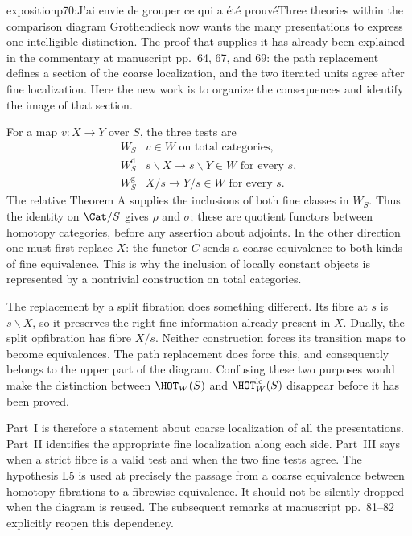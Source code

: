\begin{dcomment}{exposition}{p70:J'ai envie de grouper ce qui a été prouvé}{Three theories within the comparison diagram}
Grothendieck now wants the many presentations to express one intelligible distinction. The proof that supplies it has already been explained in the commentary at manuscript pp.~64, 67, and 69: the path replacement defines a section of the coarse localization, and the two iterated units agree after fine localization. Here the new work is to organize the consequences and identify the image of that section.

For a map $v:X\to Y$ over $S$, the three tests are
\[
\begin{array}{c|l}
 W_S&v\in W\text{ on total categories},\\
 W_S^{\mathrm d}&s\backslash X\longrightarrow s\backslash Y\in W
                    \text{ for every }s,\\
 W_S^{\mathrm g}&X/s\longrightarrow Y/s\in W
                    \text{ for every }s.
\end{array}
\]
The relative Theorem A supplies the inclusions of both fine classes in $W_S$. Thus the identity on $\Cat/S$ gives $\rho$ and $\sigma$; these are quotient functors between homotopy categories, before any assertion about adjoints. In the other direction one must first replace $X$: the functor $C$ sends a coarse equivalence to both kinds of fine equivalence. This is why the inclusion of locally constant objects is represented by a nontrivial construction on total categories.

The replacement by a split fibration does something different. Its fibre at $s$ is $s\backslash X$, so it preserves the right-fine information already present in $X$. Dually, the split opfibration has fibre $X/s$. Neither construction forces its transition maps to become equivalences. The path replacement does force this, and consequently belongs to the upper part of the diagram. Confusing these two purposes would make the distinction between $\HOT_W(S)$ and $\HOT_W^{\mathrm{lc}}(S)$ disappear before it has been proved.

Part~I is therefore a statement about coarse localization of all the presentations. Part~II identifies the appropriate fine localization along each side. Part~III says when a strict fibre is a valid test and when the two fine tests agree. The hypothesis L5 is used at precisely the passage from a coarse equivalence between homotopy fibrations to a fibrewise equivalence. It should not be silently dropped when the diagram is reused. The subsequent remarks at manuscript pp.~81--82 explicitly reopen this dependency.
\end{dcomment}

